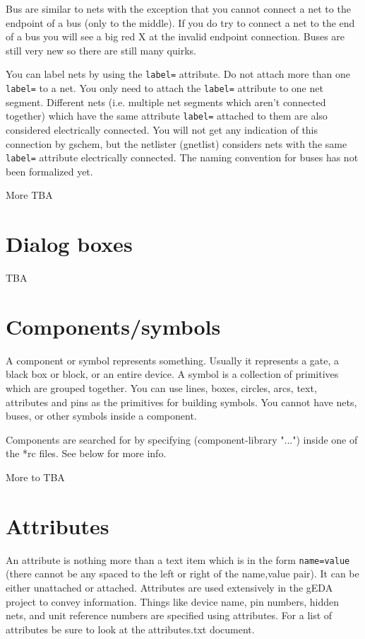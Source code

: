 \documentclass{article}
\begin{document}
Bus are similar to nets with the exception that you cannot connect a
net to the endpoint of a bus (only to the middle).  If you do try to
connect a net to the end of a bus you will see a big red X at the
invalid endpoint connection.  Buses are still very new so there are
still many quirks.

You can label nets by using the {\tt label=} attribute.  Do not attach more
than one {\tt label=} to a net. You only need to attach the {\tt label=} attribute
to one net segment.  Different nets (i.e. multiple net segments which
aren't connected together) which have the same attribute {\tt label=}
attached to them are also considered electrically connected.  You will
not get any indication of this connection by gschem, but the netlister
(gnetlist) considers nets with the same {\tt label=} attribute electrically
connected.  The naming convention for buses has not been formalized
yet.

More TBA

\section{Dialog boxes}
TBA

\section{Components/symbols}
A component or symbol represents something.  Usually it represents a
gate, a black box or block, or an entire device.  A symbol is a
collection of primitives which are grouped together. You can use
lines, boxes, circles, arcs, text, attributes and pins as the
primitives for building symbols.  You cannot have nets, buses, or
other symbols inside a component.

Components are searched for by specifying (component-library "...")
inside one of the *rc files.  See below for more info. 

More to TBA

\section{Attributes}
An attribute is nothing more than a text item which is in the form
{\tt name=value} (there cannot be any spaced to the left or right of the
name,value pair).  It can be either unattached or attached.
Attributes are used extensively in the gEDA project to convey
information.  Things like device name, pin numbers, hidden nets, and
unit reference numbers are specified using attributes.  For a list of
attributes be sure to look at the attributes.txt document.
\end{document}
